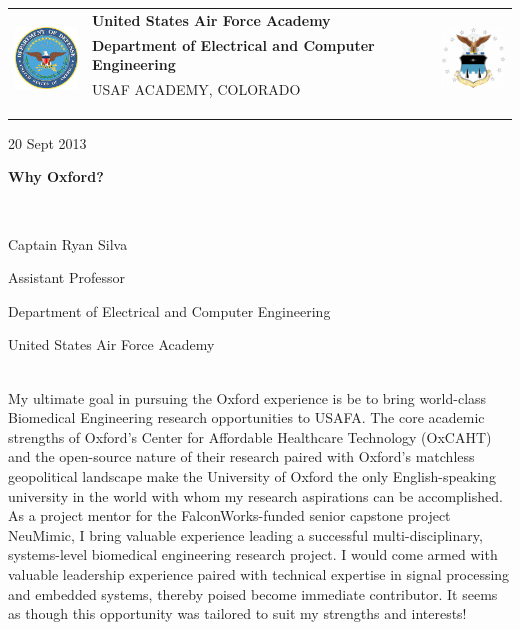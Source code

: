 \documentclass{article}
\begin{document}
	\noindent \begin{tabu} to \textwidth{l X[c] r}
	 & 
	\textbf{United States Air Force Academy} &  
	\\
	& \textbf{Department of Electrical and Computer Engineering} & \\
	& \tiny{USAF ACADEMY, COLORADO}\\
	\\ \\ \\
	\end{tabu}

	\hfill 20 Sept 2013
	\centerline{\LARGE{\textbf{Why Oxford?}}} \hspace{0pt} \\
	\centerline{\Large{Captain Ryan Silva}}
	\centerline{\large{Assistant Professor}}
	\centerline{\large{Department of Electrical and Computer Engineering}}
	\centerline{\large{United States Air Force Academy}} \hspace{0pt} \\
\indent My ultimate goal in pursuing the Oxford experience is be to bring world-class
Biomedical Engineering research opportunities to USAFA. The core academic
strengths of Oxford's Center for Affordable Healthcare Technology (OxCAHT) and
the open-source nature of their research paired with Oxford's matchless
geopolitical landscape make the University of Oxford the only English-speaking
university in the world with whom my research aspirations can be accomplished.
As a project mentor for the FalconWorks-funded senior capstone project
NeuMimic, I bring valuable experience leading a successful multi-disciplinary,
systems-level biomedical engineering research project. I would come armed with 
valuable leadership experience paired with technical expertise in signal processing and 
embedded systems, thereby poised become immediate contributor.
It seems as though this opportunity was tailored to suit my strengths and interests! 
 
\end{document}
